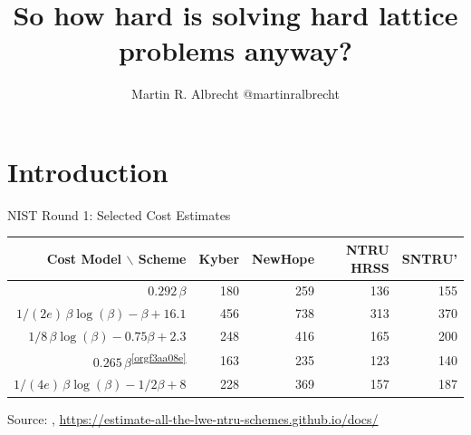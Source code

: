 \documentclass[xcolor=table,10pt,aspectratio=169]{beamer}
\author{Martin R. Albrecht \alert{@martinralbrecht}}
\date{10 July 2019, AfricaCrypt\vfill \begin{scriptsize}Based on joint work with Alex Davidson, Amit Deo, Benjamin R. Curtis, Eamonn W. Postlethwaite, Elena Kirshanova, Fernando Virdia, Florian Göpfert, Gottfried Herold, John M. Schanck, Léo Ducas, Marc Stevens, Rachel Player, Sam Scott, Thomas Wunderer and Vlad Gheorghiu as well as the work of many other authors.\end{scriptsize}}
\title{So how hard is solving hard lattice problems anyway?}
\def\enumworstfit{\(1/(2e)\, \beta \log(\beta) - \beta + 16.1\)}
\def\enumavgfit{\(1/8\,\beta \log(\beta) - 0.75\beta + 2.3\)}
\def\qenumworstfit{\(1/(4e)\, \beta \log(\beta) - 1/2\beta + 8\)}
\begin{document}
\maketitle

\section{Introduction}
\label{sec:org6105e26}
\begin{frame}[label={sec:org47f5f41}]{NIST Round 1: Selected Cost Estimates}

\begin{center}
\small{
\begin{tabular}{rrrrr}
\textbf{Cost Model} $\backslash$    \textbf{Scheme} & \textbf{Kyber} & \textbf{NewHope} & \textbf{NTRU HRSS} & \textbf{SNTRU'}\\
\hline
\(0.292\,β\)\footnotemark & 180 & 259 & 136 & 155\\
\enumworstfit \footnotemark & 456 & 738 & 313 & 370\\
\enumavgfit \footnotemark & 248 & 416 & 165 & 200\\
\hline
\(0.265\,\beta\)\textsuperscript{\ref{orgf3aa08e}} & 163 & 235 & 123 & 140\\
\qenumworstfit & 228 & 369 & 157 & 187\\
\end{tabular}
}
\end{center}

\scriptsize{
Source: , \url{https://estimate-all-the-lwe-ntru-schemes.github.io/docs/}
}

\vspace{1em}
\end{frame}
\end{document}
